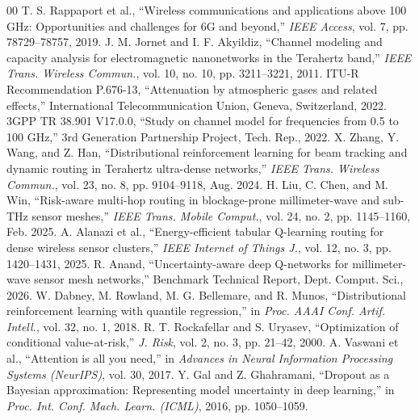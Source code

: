 \documentclass[conference]{IEEEtran}
\begin{document}
\begin{thebibliography}{00}
 T. S. Rappaport et al., ``Wireless communications and applications above 100 GHz: Opportunities and challenges for 6G and beyond,'' \textit{IEEE Access}, vol. 7, pp. 78729--78757, 2019.
 J. M. Jornet and I. F. Akyildiz, ``Channel modeling and capacity analysis for electromagnetic nanonetworks in the Terahertz band,'' \textit{IEEE Trans. Wireless Commun.}, vol. 10, no. 10, pp. 3211--3221, 2011.
 ITU-R Recommendation P.676-13, ``Attenuation by atmospheric gases and related effects,'' International Telecommunication Union, Geneva, Switzerland, 2022.
 3GPP TR 38.901 V17.0.0, ``Study on channel model for frequencies from 0.5 to 100 GHz,'' 3rd Generation Partnership Project, Tech. Rep., 2022.
 X. Zhang, Y. Wang, and Z. Han, ``Distributional reinforcement learning for beam tracking and dynamic routing in Terahertz ultra-dense networks,'' \textit{IEEE Trans. Wireless Commun.}, vol. 23, no. 8, pp. 9104--9118, Aug. 2024.
 H. Liu, C. Chen, and M. Win, ``Risk-aware multi-hop routing in blockage-prone millimeter-wave and sub-THz sensor meshes,'' \textit{IEEE Trans. Mobile Comput.}, vol. 24, no. 2, pp. 1145--1160, Feb. 2025.
 A. Alanazi et al., ``Energy-efficient tabular Q-learning routing for dense wireless sensor clusters,'' \textit{IEEE Internet of Things J.}, vol. 12, no. 3, pp. 1420--1431, 2025.
 R. Anand, ``Uncertainty-aware deep Q-networks for millimeter-wave sensor mesh networks,'' Benchmark Technical Report, Dept. Comput. Sci., 2026.
 W. Dabney, M. Rowland, M. G. Bellemare, and R. Munos, ``Distributional reinforcement learning with quantile regression,'' in \textit{Proc. AAAI Conf. Artif. Intell.}, vol. 32, no. 1, 2018.
 R. T. Rockafellar and S. Uryasev, ``Optimization of conditional value-at-risk,'' \textit{J. Risk}, vol. 2, no. 3, pp. 21--42, 2000.
 A. Vaswani et al., ``Attention is all you need,'' in \textit{Advances in Neural Information Processing Systems (NeurIPS)}, vol. 30, 2017.
 Y. Gal and Z. Ghahramani, ``Dropout as a Bayesian approximation: Representing model uncertainty in deep learning,'' in \textit{Proc. Int. Conf. Mach. Learn. (ICML)}, 2016, pp. 1050--1059.
\end{thebibliography}
\end{document}
